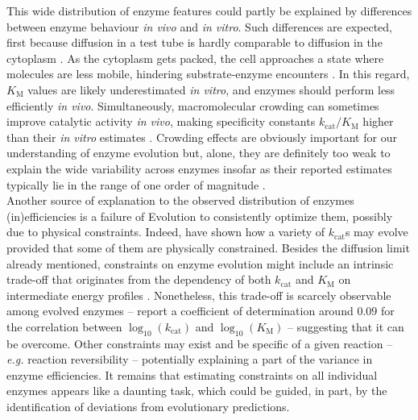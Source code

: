 
This wide distribution of enzyme features could partly be explained by differences between enzyme behaviour \textit{in vivo} and \textit{in vitro}. Such differences are expected, first because diffusion in a test tube is hardly comparable to diffusion in the cytoplasm \citep{Ellis01,Rivas04,Zhou08,Rivas18}. As the cytoplasm gets packed, the cell approaches a state where molecules are less mobile, hindering substrate-enzyme encounters \citep{Muramatsu88,Zimmerman93,Blanco18}. In this regard, $K_\text{M}$ values are likely underestimated \textit{in vitro}, and enzymes should perform less efficiently \textit{in vivo}. Simultaneously, macromolecular crowding can sometimes improve catalytic activity \textit{in vivo}, making specificity constants $k_\text{cat}/K_\text{M}$ higher than their \textit{in vitro} estimates \citep{Ralston90,Ellis01,Jiang07,Pozdnyakova10}. Crowding effects are obviously important for our understanding of enzyme evolution but, alone, they are definitely too weak to explain the wide variability across enzymes insofar as their reported estimates typically lie in the range of one order of magnitude \citep{Davidi16}. \\%

Another source of explanation to the observed distribution of enzymes (in)efficiencies is a failure of Evolution to consistently optimize them, possibly due to physical constraints. Indeed, \citet{Heckmann18} have shown how a variety of $k_\text{cat}$s may evolve provided that some of them are physically constrained. Besides the diffusion limit already mentioned, constraints on enzyme evolution might include an intrinsic trade-off \citep{Gudelj10,Stiffler15} that originates from the dependency of both $k_\text{cat}$ and $K_\text{M}$ on intermediate energy profiles \citep{Heinrich91}. Nonetheless, this trade-off is scarcely observable among evolved enzymes -- \citet{Bar-Even11} report a coefficient of determination around $0.09$ for the correlation between $\log_{10}(k_\text{cat})$ and $\log_{10}(K_\text{M})$ -- suggesting that it can be overcome. 
Other constraints may exist and be specific of a given reaction \citep{Klipp94} -- \textit{e.g.} reaction reversibility -- potentially explaining a part of the variance in enzyme efficiencies.
It remains that estimating constraints on all individual enzymes appears like a daunting task, which could be guided, in part, by the identification of deviations from evolutionary predictions.\\


